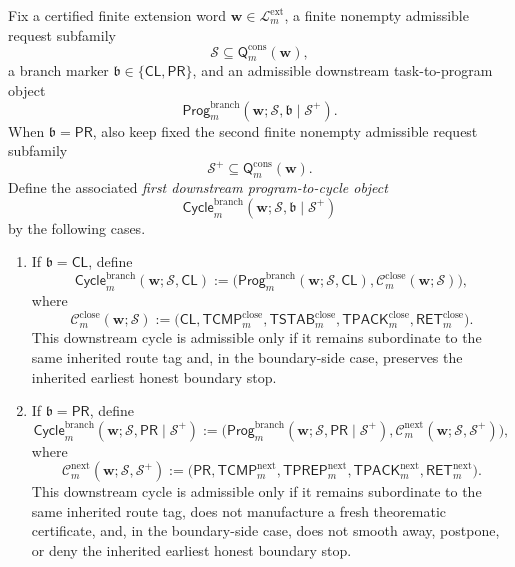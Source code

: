 \begin{definition}
\label{def:first-downstream-program-to-cycle-object}
Fix a certified finite extension word \(\mathbf w\in\mathcal L^{\mathrm{ext}}_{m}\), a finite nonempty admissible request subfamily
\[
 \mathcal S \subseteq \mathsf{Q}^{\mathrm{cons}}_{m}(\mathbf w),
\]
a branch marker \(\mathfrak b\in\{\mathsf{CL},\mathsf{PR}\}\), and an admissible downstream task-to-program object
\[
 \mathsf{Prog}^{\mathrm{branch}}_{m}(\mathbf w;\mathcal S,\mathfrak b\mid\mathcal S^{+}).
\]
When \(\mathfrak b=\mathsf{PR}\), also keep fixed the second finite nonempty admissible request subfamily
\[
 \mathcal S^{+}\subseteq \mathsf{Q}^{\mathrm{cons}}_{m}(\mathbf w).
\]
Define the associated \emph{first downstream program-to-cycle object}
\[
 \mathsf{Cycle}^{\mathrm{branch}}_{m}(\mathbf w;\mathcal S,\mathfrak b\mid\mathcal S^{+})
\]
by the following cases.
\begin{enumerate}[label=(\roman*)]
 \item If \(\mathfrak b=\mathsf{CL}\), define
\[
 \mathsf{Cycle}^{\mathrm{branch}}_{m}(\mathbf w;\mathcal S,\mathsf{CL})
 :=
 \bigl(\mathsf{Prog}^{\mathrm{branch}}_{m}(\mathbf w;\mathcal S,\mathsf{CL}),\mathcal C^{\mathrm{close}}_{m}(\mathbf w;\mathcal S)\bigr),
\]
where
\[
 \mathcal C^{\mathrm{close}}_{m}(\mathbf w;\mathcal S)
 :=
 \bigl(\mathsf{CL},\mathsf{TCMP}^{\mathrm{close}}_{m},\mathsf{TSTAB}^{\mathrm{close}}_{m},\mathsf{TPACK}^{\mathrm{close}}_{m},\mathsf{RET}^{\mathrm{close}}_{m}\bigr).
\]
This downstream cycle is admissible only if it remains subordinate to the same inherited route tag and, in the boundary-side case, preserves the inherited earliest honest boundary stop.

 \item If \(\mathfrak b=\mathsf{PR}\), define
\[
 \mathsf{Cycle}^{\mathrm{branch}}_{m}(\mathbf w;\mathcal S,\mathsf{PR}\mid\mathcal S^{+})
 :=
 \bigl(\mathsf{Prog}^{\mathrm{branch}}_{m}(\mathbf w;\mathcal S,\mathsf{PR}\mid\mathcal S^{+}),\mathcal C^{\mathrm{next}}_{m}(\mathbf w;\mathcal S,\mathcal S^{+})\bigr),
\]
where
\[
 \mathcal C^{\mathrm{next}}_{m}(\mathbf w;\mathcal S,\mathcal S^{+})
 :=
 \bigl(\mathsf{PR},\mathsf{TCMP}^{\mathrm{next}}_{m},\mathsf{TPREP}^{\mathrm{next}}_{m},\mathsf{TPACK}^{\mathrm{next}}_{m},\mathsf{RET}^{\mathrm{next}}_{m}\bigr).
\]
This downstream cycle is admissible only if it remains subordinate to the same inherited route tag, does not manufacture a fresh theorematic certificate, and, in the boundary-side case, does not smooth away, postpone, or deny the inherited earliest honest boundary stop.
\end{enumerate}
\end{definition}

